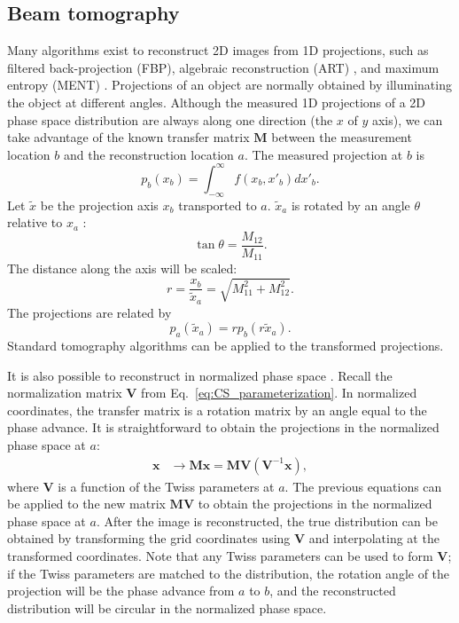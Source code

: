\subsection{Beam tomography}

Many algorithms exist to reconstruct 2D images from 1D projections, such as filtered back-projection (FBP), algebraic reconstruction (ART) \cite{Slaney1988}, and maximum entropy (MENT) \cite{Minerbo1979}. Projections of an object are normally obtained by illuminating the object at different angles. Although the measured 1D projections of a 2D phase space distribution are always along one direction (the $x$ of $y$ axis), we can take advantage of the known transfer matrix $\mathbf{M}$ between the measurement location $b$ and the reconstruction location $a$. The measured projection at $b$ is
%
\begin{equation}
    p_b(x_b) = \int_{-\infty}^{\infty} f(x_b, x'_b) dx'_b.
\end{equation}
%
Let $\tilde{x}$ be the projection axis $x_b$ transported to $a$. $\tilde{x}_a$ is rotated by an angle $\theta$ relative to $x_a$ \cite{Hock2013a}: 
%
\begin{equation}\label{eq:proj_trans_1}
    \tan\theta = \frac{M_{12}}{M_{11}}.
\end{equation}
%
The distance along the axis will be scaled:
%
\begin{equation}\label{eq:proj_trans_2}
    r = \frac{x_b}{\tilde{x}_a} = \sqrt{M_{11}^2 + M_{12}^2}.
\end{equation}
%
The projections are related by
%
\begin{equation}\label{eq:proj_trans_3}
    p_a(\tilde{x}_a) = r p_b(r\tilde{x}_a).
\end{equation}
%
Standard tomography algorithms can be applied to the transformed projections.

It is also possible to reconstruct in normalized phase space \cite{Hock2011}. Recall the normalization matrix $\mathbf{V}$ from Eq.~\eqref{eq:CS_parameterization}. In normalized coordinates, the transfer matrix is a rotation matrix by an angle equal to the phase advance. It is straightforward to obtain the projections in the normalized phase space at $a$:
%
\begin{equation}
\begin{aligned}
    \mathbf{x} &\rightarrow \mathbf{M} \mathbf{x}
    = \mathbf{M} \mathbf{V} (\mathbf{V}^{-1} \mathbf{x})
    ,
\end{aligned}
\end{equation}
%
where $\mathbf{V}$ is a function of the Twiss parameters at $a$. The previous equations can be applied to the new matrix $\mathbf{M} \mathbf{V}$ to obtain the projections in the normalized phase space at $a$. After the image is reconstructed, the true distribution can be obtained by transforming the grid coordinates using $\mathbf{V}$ and interpolating at the transformed coordinates. Note that any Twiss parameters can be used to form $\mathbf{V}$; if the Twiss parameters are matched to the distribution, the rotation angle of the projection will be the phase advance from $a$ to $b$, and the reconstructed distribution will be circular in the normalized phase space. 



